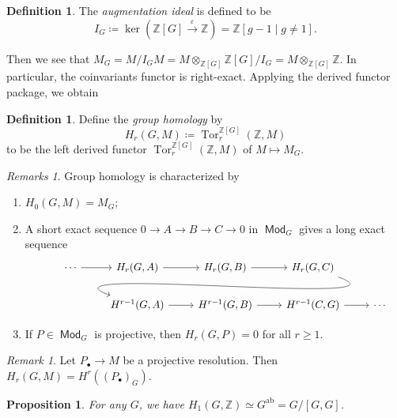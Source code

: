\documentclass[leqno, openany]{memoir}
\newtheorem{prop}[thm]{Proposition}
\theoremstyle{definition}
\newtheorem{defn}[thm]{Definition}
\theoremstyle{remark}
\newtheorem{rmk}[thm]{Remark}
\newtheorem{rmks}[thm]{Remarks}
\theoremstyle{plain}
\theoremstyle{definition}
\theoremstyle{remark}
\newcommand{\Z}{\mathbb{Z}}
\newcommand{\ep}{\varepsilon}
\newcommand{\mr}[1]{\mathrm{#1}}
\DeclareMathOperator{\Tor}{Tor}
\DeclareMathOperator{\Mod}{\mathsf{Mod}}
\begin{document}
\begin{defn}
    The \textit{augmentation ideal} is defined to be
    \[ I_G \coloneqq \ker (\Z[G] \xrightarrow{\ep} \Z) = \Z[g-1 \mid g \neq 1]. \]
\end{defn}

Then we see that $M_G = M/I_G M = M \otimes_{\Z[G]} \Z[G]/I_G = M \otimes_{\Z[G]} \Z$. In particular, the coinvariants functor is right-exact. Applying the derived functor package, we obtain

\begin{defn}
    Define the \textit{group homology} by 
    \[ H_r(G, M) \coloneqq \Tor_r^{\Z[G]} (\Z, M) \]
    to be the left derived functor $\Tor_r^{\Z[G]}(\Z, M)$ of $M \mapsto M_G$.
\end{defn}

\begin{rmks}
    Group homology is characterized by
    \begin{enumerate}
        \item $H_0(G, M) = M_G$;
        \item A short exact sequence $0 \to A \to B \to C \to 0$ in $\Mod_G$ gives a long exact sequence
            \begin{equation*}
            \begin{tikzcd}
                \cdots \arrow{r} & H_r(G, A) \ar{r} & H_r(G, B) \ar{r} & H_r(G, C) \ar[out=-20,in=160]{dll} \\
                                 & H^{r-1}(G,A) \ar{r} & H^{r-1}(G,B) \ar{r} & H^{r-1}(C,G) \ar{r} & \cdots
            \end{tikzcd}
            \end{equation*}
        \item If $P \in \Mod_G$ is projective, then $H_r(G, P) = 0$ for all $r \geq 1$.
    \end{enumerate}
\end{rmks}

\begin{rmk}
    Let $P_{\bullet} \to M$ be a projective resolution. Then $H_r(G, M) = H^r({(P_{\bullet})}_G)$.
\end{rmk}

\begin{prop}
    For any $G$, we have $H_1(G, \Z) \simeq G^{\mr{ab}} = G/[G,G]$.
\end{prop}
\end{document}

